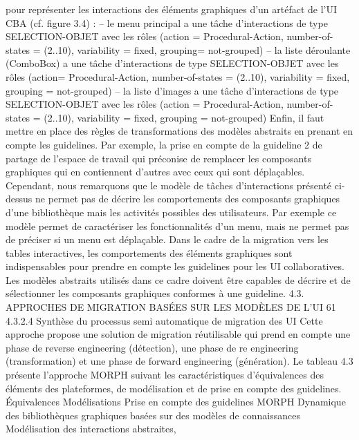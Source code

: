 \documentclass{article}
\begin{document}
pour repr\'{e}senter les interactions des \'{e}l\'{e}ments graphiques d’un art\'{e}fact de l’UI CBA (cf. ﬁgure 3.4) :
– le menu principal a une t\^{a}che d’interactions de type SELECTION-OBJET avec les r\^{o}les (action
= Procedural-Action, number-of-states = (2..10), variability = ﬁxed, grouping= not-grouped)
– la liste d\'{e}roulante (ComboBox) a une t\^{a}che d’interactions de type SELECTION-OBJET avec
les r\^{o}les (action= Procedural-Action, number-of-states = (2..10), variability = ﬁxed, grouping =
not-grouped)
– la liste d’images a une t\^{a}che d’interactions de type SELECTION-OBJET avec les r\^{o}les (action
= Procedural-Action, number-of-states = (2..10), variability = ﬁxed, grouping = not-grouped)
Enﬁn, il faut mettre en place des r\`{e}gles de transformations des mod\`{e}les abstraits en prenant en
compte les guidelines. Par exemple, la prise en compte de la guideline 2 de partage de l’espace de
travail qui pr\'{e}conise de remplacer les composants graphiques qui en contiennent d’autres avec ceux
qui sont d\'{e}pla\c{c}ables. Cependant, nous remarquons que le mod\`{e}le de t\^{a}ches d’interactions pr\'{e}sent\'{e}
ci-dessus ne permet pas de d\'{e}crire les comportements des composants graphiques d’une biblioth\`{e}que
mais les activit\'{e}s possibles des utilisateurs. Par exemple ce mod\`{e}le permet de caract\'{e}riser les fonctionnalit\'{e}s d’un menu, mais ne permet pas de pr\'{e}ciser si un menu est d\'{e}pla\c{c}able. Dans le cadre de la
migration vers les tables interactives, les comportements des \'{e}l\'{e}ments graphiques sont indispensables
pour prendre en compte les guidelines pour les UI collaboratives. Les mod\`{e}les abstraits utilis\'{e}s dans
ce cadre doivent \^{e}tre capables de d\'{e}crire et de s\'{e}lectionner les composants graphiques conformes \`{a}
une guideline.
4.3. APPROCHES DE MIGRATION BASÉES SUR LES MODÈLES DE L’UI
61
4.3.2.4
Synth\`{e}se du processus semi automatique de migration des UI
Cette approche propose une solution de migration r\'{e}utilisable qui prend en compte une phase
de reverse engineering (d\'{e}tection), une phase de re engineering (transformation) et une phase de
forward engineering (g\'{e}n\'{e}ration). Le tableau 4.3 pr\'{e}sente l’approche MORPH suivant les caract\'{e}ristiques d’\'{e}quivalences des \'{e}l\'{e}ments des plateformes, de mod\'{e}lisation et de prise en compte des
guidelines.
Équivalences
Mod\'{e}lisations
Prise en compte des
guidelines
MORPH
Dynamique des
biblioth\`{e}ques
graphiques bas\'{e}es sur
des mod\`{e}les de
connaissances
Mod\'{e}lisation des
interactions abstraites,
\end{document}
